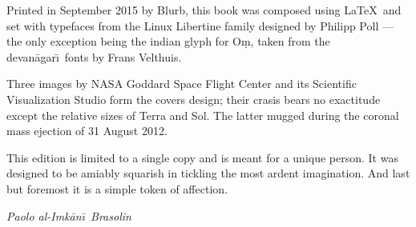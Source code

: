 \documentclass[10pt]{memoir}
\begin{document}
    \begin{adjustwidth}{0.18\textwidth}{0.18\textwidth}
      \footnotesize
      \parindent=0pt
      \parfillskip=0pt
      Printed in September 2015 by Blurb, this book was
      composed using \LaTeX\ and set with typefaces from
      the Linux Libertine family designed by Philipp Poll
      --- the only exception being the indian glyph for O\d m,
      taken from the devan\=agar\=\i\ fonts by Frans Velthuis.\par
      \medskip
      Three images by NASA Goddard Space Flight Center
      and its Scientific Visualization Studio form the covers
      design; their crasis bears no exactitude except the
      relative sizes of Terra and Sol. The latter mugged
      during the coronal mass ejection of 31 August 2012.\par
      \bigskip
      This edition is limited to a single copy and is meant
      for a unique person. It was designed to be amiably
      squarish in tickling the most ardent imagination.
      And last but foremost it is a simple token of affection.\par
      \smallskip
      \raggedleft\itshape
      Paolo al-Imk\=an\=\i\ Brasolin\par
    \end{adjustwidth}
    \vfill
    \cleartoverso %
    \null
\end{document}
